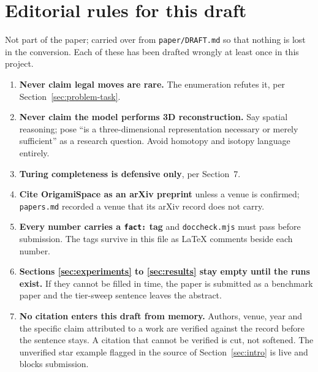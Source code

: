 \section{Editorial rules for this draft}
\label{app:editorial}

Not part of the paper; carried over from \texttt{paper/DRAFT.md} so that nothing is lost in the
conversion. Each of these has been drafted wrongly at least once in this project.

\begin{enumerate}
\item \textbf{Never claim legal moves are rare.} The enumeration refutes it, per
  Section~\ref{sec:problem-task}.
\item \textbf{Never claim the model performs 3D reconstruction.} Say spatial reasoning; pose ``is a
  three-dimensional representation necessary or merely sufficient'' as a research question. Avoid
  homotopy and isotopy language entirely.
\item \textbf{Turing completeness is defensive only}, per Section~7.
\item \textbf{Cite OrigamiSpace as an arXiv preprint} unless a venue is confirmed;
  \texttt{papers.md} recorded a venue that its arXiv record does not carry.
\item \textbf{Every number carries a \texttt{fact:} tag} and \texttt{doccheck.mjs} must pass before
  submission. The tags survive in this file as LaTeX comments beside each number.
\item \textbf{Sections \ref{sec:experiments} to \ref{sec:results} stay empty until the runs exist.}
  If they cannot be filled in time, the paper is submitted as a benchmark paper and the tier-sweep
  sentence leaves the abstract.
\item \textbf{No citation enters this draft from memory.} Authors, venue, year and the specific
  claim attributed to a work are verified against the record before the sentence stays. A citation
  that cannot be verified is cut, not softened. The unverified star example flagged in the source
  of Section~\ref{sec:intro} is live and blocks submission.
\end{enumerate}

